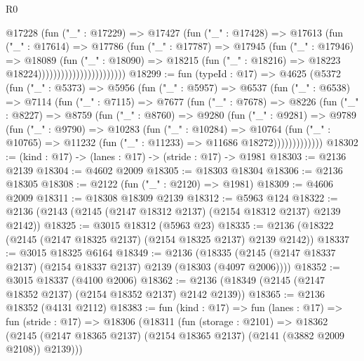 \begin{lexlean}{R0}
\begin{coremodule}
                                  @17228
                                    (fun ("_" : @17229) =>
                                    @17427
                                      (fun ("_" : @17428) =>
                                      @17613
                                        (fun ("_" : @17614) =>
                                        @17786
                                          (fun ("_" : @17787) =>
                                          @17945
                                            (fun ("_" : @17946) =>
                                            @18089
                                              (fun ("_" : @18090) =>
                                              @18215
                                                (fun ("_" : @18216) =>
                                                @18223 @18224)))))))))))))))))))))))
@18299 := fun (typeId : @17) =>
  @4625
    (@5372
      (fun ("_" : @5373) =>
      @5956
        (fun ("_" : @5957) =>
        @6537
          (fun ("_" : @6538) =>
          @7114
            (fun ("_" : @7115) =>
            @7677
              (fun ("_" : @7678) =>
              @8226
                (fun ("_" : @8227) =>
                @8759
                  (fun ("_" : @8760) =>
                  @9280
                    (fun ("_" : @9281) =>
                    @9789
                      (fun ("_" : @9790) =>
                      @10283
                        (fun ("_" : @10284) =>
                        @10764
                          (fun ("_" : @10765) =>
                          @11232 (fun ("_" : @11233) => @11686 @18272)))))))))))))
@18302 := (kind : @17) -> (lanes : @17) -> (stride : @17) -> @1981
@18303 := @2136 @2139
@18304 := @4602 @2009
@18305 := @18303 @18304
@18306 := @2136 @18305
@18308 := @2122 (fun ("_" : @2120) => @1981)
@18309 := @4606 @2009
@18311 := @18308 @18309 @2139
@18312 := @5963 @124
@18322 := @2136 (@2143 (@2145 (@2147 @18312 @2137) (@2154 @18312 @2137) @2139 @2142))
@18325 := @3015 @18312 (@5963 @23)
@18335 := @2136 (@18322 (@2145 (@2147 @18325 @2137) (@2154 @18325 @2137) @2139 @2142))
@18337 := @3015 @18325 @6164
@18349 := @2136
    (@18335 (@2145 (@2147 @18337 @2137) (@2154 @18337 @2137) @2139 (@18303 (@4097 @2006))))
@18352 := @3015 @18337 (@4100 @2006)
@18362 := @2136 (@18349 (@2145 (@2147 @18352 @2137) (@2154 @18352 @2137) @2142 @2139))
@18365 := @2136 @18352 (@4131 @2112)
@18383 := fun (kind : @17) =>
  fun (lanes : @17) =>
  fun (stride : @17) =>
  @18306
    (@18311
      (fun (storage : @2101) =>
      @18362 (@2145 (@2147 @18365 @2137) (@2154 @18365 @2137) (@2141 (@3882 @2009 @2108)) @2139)))

\end{coremodule}
\end{lexlean}
